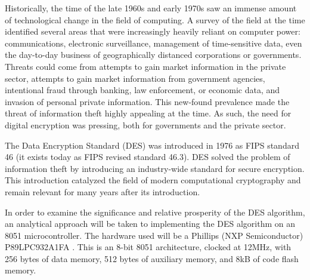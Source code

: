 \documentclass[conference]{IEEEtran}
\begin{document}
Historically, the time of the late 1960s and early 1970s saw an immense amount of technological change in the field of computing. A survey of the field at the time identified several areas that were increasingly heavily reliant on computer power: communications, electronic surveillance, management of time-sensitive data, even the day-to-day business of geographically distanced corporations or governments\cite{des_survey}. Threats could come from attempts to gain market information in the private sector, attempts to gain market information from government agencies, intentional fraud through banking, law enforcement, or economic data, and invasion of personal private information. This new-found prevalence made the threat of information theft highly appealing at the time. As such, the need for digital encryption was pressing, both for governments and the private sector.	

The Data Encryption Standard (DES) was introduced in 1976 as FIPS standard 46 (it exists today as FIPS revised standard 46.3\cite{fips_46_3}). DES solved the problem of information theft by introducing an industry-wide standard for secure encryption. This introduction catalyzed the field of modern computational cryptography and remain relevant for many years after its introduction.

In order to examine the significance and relative prosperity of the DES algorithm, an analytical approach will be taken to implementing the DES algorithm on an 8051 microcontroller. The hardware used will be a Phillips (NXP Semiconductor) P89LPC932A1FA \cite{8051_datasheet}. This is an 8-bit 8051 architecture, clocked at 12MHz, with 256 bytes of data memory, 512 bytes of auxiliary memory, and 8kB of code flash memory.
\end{document}
